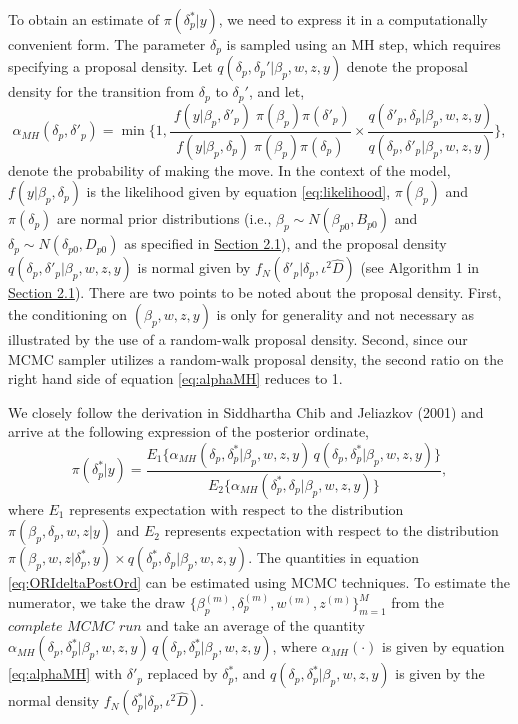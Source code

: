 To obtain an estimate of \(\pi(\delta_{p}^{\ast}|y)\), we need to express it in a computationally convenient form. The parameter \(\delta_{p}\) is sampled using an MH step, which requires specifying a proposal density. Let \(q(\delta_{p}, \delta_{p}'|\beta_{p},w,z,y)\) denote the proposal density for the transition from \(\delta_{p}\) to \(\delta_{p}'\), and let,
\begin{equation} 
\alpha_{MH}(\delta_{p}, \delta'_{p}) = \min \bigg\{1, \frac{ \;f(y|\beta_{p},\delta'_{p}) \;\pi(\beta_{p}) \pi(\delta'_{p})} {f(y|\beta_{p},\delta_{p}) \;\pi(\beta_{p}) \pi(\delta_{p})} \times \frac{q(\delta'_{p}, \delta_{p}|\beta_{p},w,z,y)}{q(\delta_{p}, \delta'_{p} |\beta_{p},w,z,y)} \bigg\},
\label{eq:alphaMH} 
\end{equation}
denote the probability of making the move. In the context of the model, \(f(y|\beta_{p},\delta_{p})\) is the likelihood given by equation \eqref{eq:likelihood}, \(\pi(\beta_{p})\) and \(\pi(\delta_{p})\) are normal prior distributions (i.e., \(\beta_{p} \sim N(\beta_{p0}, B_{p0})\) and \(\delta_{p}\sim N(\delta_{p0}, D_{p0})\) as specified in \protect\hyperlink{sec:ORI}{Section 2.1}), and the proposal density \(q(\delta_{p}, \delta'_{p} |\beta_{p},w,z,y)\) is normal given by \(f_{N}(\delta'_{p}|\delta_{p}, \iota^{2}\hat{D})\) (see Algorithm 1 in \protect\hyperlink{sec:ORI}{Section 2.1}). There are two points to be noted about the proposal density. First, the conditioning on \((\beta_{p},w,z,y)\) is only for generality and not necessary as illustrated by the use of a random-walk proposal density. Second, since our MCMC sampler utilizes a random-walk proposal density, the second ratio on the right hand side of equation \eqref{eq:alphaMH} reduces to 1.

We closely follow the derivation in Siddhartha Chib and Jeliazkov (2001) and arrive at the following expression of the posterior ordinate,
\begin{equation} 
\pi(\delta_{p}^{\ast}|y) = \frac{E_{1} \{ \alpha_{MH}(\delta_{p},\delta_{p}^{\ast}|\beta_{p},w,z,y) \, q(\delta_{p}, \delta_{p}^{\ast}|\beta_{p},w,z,y) \} }{E_{2}\{ \alpha_{MH}(\delta_{p}^{\ast}, \delta_{p}|\beta_{p},w,z,y)\} },
\label{eq:ORIdeltaPostOrd} 
\end{equation}
where \(E_{1}\) represents expectation with respect to the distribution \(\pi(\beta_{p},\delta_{p},w,z|y)\) and \(E_{2}\) represents expectation with respect to the distribution \(\pi(\beta_{p},w,z|\delta_{p}^{\ast},y) \times q(\delta_{p}^{\ast}, \delta_{p}|\beta_{p},w,z,y)\). The quantities in equation \eqref{eq:ORIdeltaPostOrd} can be estimated using MCMC techniques. To estimate the numerator, we take the draw \(\{\beta_{p}^{(m)},\delta_{p}^{(m)},w^{(m)},z^{(m)}\}_{m=1}^{M}\) from the \(\textit{complete MCMC run}\) and take an average of the quantity \(\alpha_{MH}(\delta_{p}, \delta_{p}^{\ast}|\beta_{p},w,z,y) \, q(\delta_{p}, \delta_{p}^{\ast}|\beta_{p},w,z,y)\), where \(\alpha_{MH}(\cdot)\) is given by equation \eqref{eq:alphaMH} with \(\delta'_{p}\) replaced by \(\delta_{p}^{\ast}\), and \(q(\delta_{p}, \delta_{p}^{\ast}|\beta_{p},w,z,y)\) is given by the normal density \(f_{N}(\delta_{p}^{\ast}|\delta_{p}, \iota^{2} \hat{D})\).

